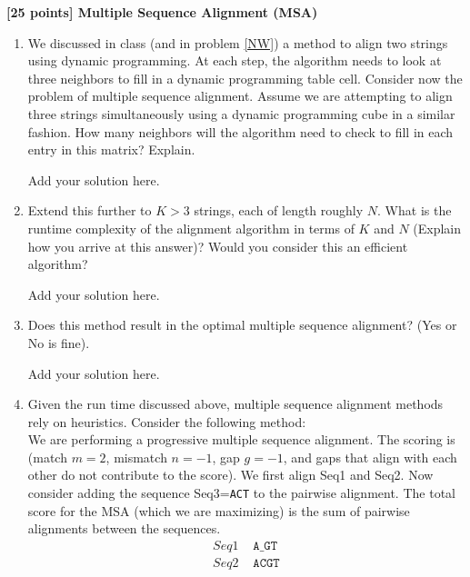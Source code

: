 {\bf [25 points] Multiple Sequence Alignment (MSA)}\\
\begin{enumerate}

\item We discussed in class (and in problem \ref{NW}) a method to align two strings using dynamic programming. At each step, the algorithm needs to look at three neighbors to fill in a dynamic programming table cell. Consider now the problem of multiple sequence alignment.  Assume we are attempting to align three strings simultaneously using a dynamic programming cube in a similar fashion. How many neighbors will the algorithm need to check to fill in each entry in this matrix? Explain.
\begin{solution}
Add your solution here.
\end{solution}
\item Extend this further to $K>3$ strings, each of length roughly $N$. What is the runtime complexity of the alignment algorithm in terms of $K$ and $N$ (Explain how you arrive at this answer)? Would you consider this an efficient algorithm?
\begin{solution}
Add your solution here.
\end{solution}
\item Does this method result in the optimal multiple sequence alignment? (Yes or No is fine).
\begin{solution}
Add your solution here.
\end{solution}
\item Given the run time discussed above, multiple sequence alignment methods rely on heuristics. Consider the following method:\\
We are performing a progressive multiple sequence alignment. The scoring is (match $m=2$, mismatch $n=-1$, gap $g=-1$, and gaps that align with each other do not contribute to the score).
We first align Seq1 and Seq2. Now consider adding the sequence Seq3=\texttt{ACT} to the pairwise alignment. The total score for the MSA (which we are maximizing) is the sum of pairwise alignments between the sequences. 
\begin{align*}
Seq1& \texttt{  A\_GT}\\
Seq2& \texttt{  ACGT}\\

\end{align*}
\end{enumerate}
